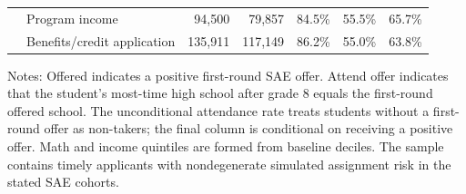 \begin{table}[!htbp]
\begin{tabular}{llrrrrr}
 & Program income & 94,500 & 79,857 & 84.5\% & 55.5\% & 65.7\% \\
 & Benefits/credit application & 135,911 & 117,149 & 86.2\% & 55.0\% & 63.8\% \\
\bottomrule
\end{tabular}
\par\medskip
\footnotesize
\begin{minipage}{0.98\textwidth}
Notes: Offered indicates a positive first-round SAE offer. Attend offer indicates that the student's most-time high school after grade 8 equals the first-round offered school. The unconditional attendance rate treats students without a first-round offer as non-takers; the final column is conditional on receiving a positive offer. Math and income quintiles are formed from baseline deciles. The sample contains timely applicants with nondegenerate simulated assignment risk in the stated SAE cohorts.
\end{minipage}
\end{table}
